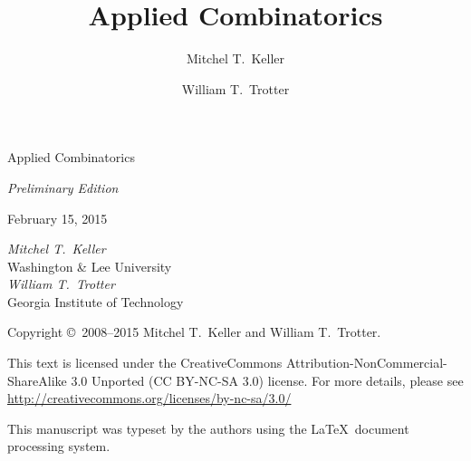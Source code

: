 \documentclass[letterpaper,chapterprefix,numbers=noenddot,fontsize=10pt]{scrbook}
\numberwithin{figure}{chapter}
\numberwithin{section}{chapter}
\begin{document}
\begin{titlepage}
\begin{center}
\parbox{1in}{}

\vspace{.6in}
\Huge{\textsf{Applied Combinatorics}}

\vspace{24pt}
\LARGE{\textsf{\textsl{Preliminary Edition}}}
\vspace{36pt}

\Large{\textsf{February 15, 2015}}

\vspace{3in} \LARGE{\textsf{\textsl{Mitchel T.\
      Keller}}}\\\Large{\textsf{Washington \& Lee University}}\\\vspace{12pt}\LARGE{\textsf{\textsl{William T.\ Trotter}}}\\
  \Large{\textsf{Georgia Institute of Technology}}
\end{center}
\end{titlepage}
\thispagestyle{empty}
\parbox{1in}{ }
\vskip4.75in

\begin{center}
  \textsf{Copyright \copyright\ 2008--2015 Mitchel T.\ Keller and William
    T.\ Trotter.}

  \vspace{12pt}
  \textsf{This text is licensed under the CreativeCommons
    Attribution-NonCommercial-ShareAlike 3.0 Unported (CC BY-NC-SA
    3.0) license. For more details, please see
    \url{http://creativecommons.org/licenses/by-nc-sa/3.0/}\\{\Huge \ccbyncsa}}
  
  \vspace{12pt}
  \textsf{This manuscript was typeset by the authors using the 
    \LaTeX\ document processing system.}
\end{center}


\author{Mitchel T.\ Keller}
\author{William T.\ Trotter}
\title{Applied Combinatorics}
\pagestyle{scrheadings}
\frontmatter


\end{document}
